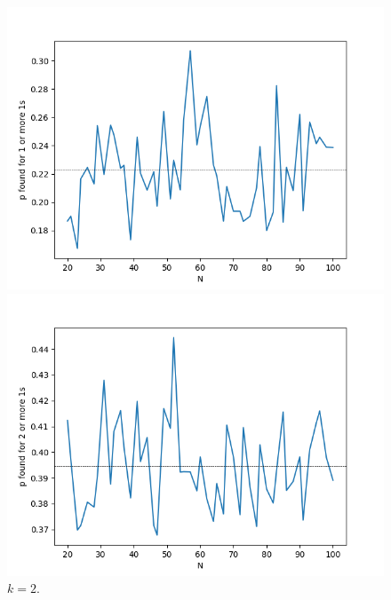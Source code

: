         \begin{figure}[!hbt]
            \centering
            \begin{minipage}{.33\linewidth}
              \centering
                \includegraphics[width = \textwidth]{../images/game2/0001_L_vs_p_MAX_L50-5100.png}
              \caption{$k = 1$.}
              \label{figure-k1}
            \end{minipage}
            \begin{minipage}{.33\linewidth}
              \centering
                \includegraphics[width = \textwidth]{../images/game2/0011_L_vs_p_MAX_L50-5100.png}
              \caption{$k = 2$.}
              \label{figure-k2}
            \end{minipage}      

\end{figure}
